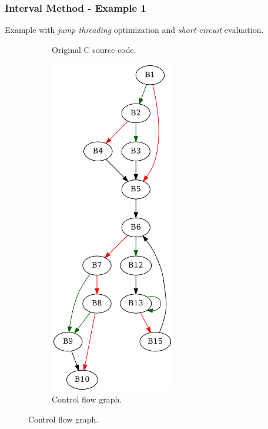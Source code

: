 

\clearpage

\subsubsection{Interval Method - Example 1}

Example with \textit{jump threading} optimization and \textit{short-circuit} evaluation.

\begin{figure}[htbp]
	\centering
	\begin{subfigure}[b]{0.30\textwidth}
		\centering
		
		\caption{Original C source code.}
	\end{subfigure}
	\begin{subfigure}[b]{0.50\textwidth}
		\centering
		\includegraphics[width=0.6\textwidth]{inc/appendices/examples/interval/example/sample/f.png}
		\caption{Control flow graph.}
	\end{subfigure}
\end{figure}

